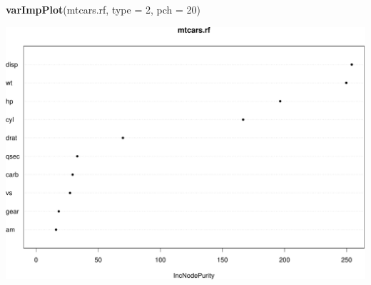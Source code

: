 \documentclass[ignorenonframetext,]{beamer}
\newenvironment{Shaded}{\begin{snugshade}}{\end{snugshade}}
\newcommand{\KeywordTok}[1]{\textcolor[rgb]{0.13,0.29,0.53}{\textbf{#1}}}
\newcommand{\DataTypeTok}[1]{\textcolor[rgb]{0.13,0.29,0.53}{#1}}
\newcommand{\DecValTok}[1]{\textcolor[rgb]{0.00,0.00,0.81}{#1}}
\newcommand{\NormalTok}[1]{#1}
\begin{document}
\begin{frame}[fragile]

\begin{Shaded}
\begin{Highlighting}[]
\KeywordTok{varImpPlot}\NormalTok{(mtcars.rf, }\DataTypeTok{type =} \DecValTok{2}\NormalTok{, }\DataTypeTok{pch =} \DecValTok{20}\NormalTok{)}
\end{Highlighting}
\end{Shaded}

\includegraphics{8TreesBEAMER_files/figure-beamer/unnamed-chunk-29-1.pdf}

\end{frame}
\end{document}
